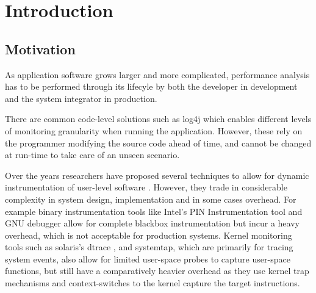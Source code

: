 
\section{Introduction}
\label{sec:intro}



\subsection{Motivation}

As application software grows larger and more complicated, performance analysis has to be performed through its lifecyle by both the developer in development and the system integrator in production.

There are common code-level solutions such as log4j \cite{log4j} which enables different levels of monitoring granularity when running the application. However, these rely on the programmer modifying the source code ahead of time, and cannot be changed at run-time to take care of an unseen scenario. 

Over the years researchers have proposed several techniques to allow for dynamic instrumentation of user-level software \cite{pin,gdb,dtrace,systemtap,lttng,utrace,ptrace}. However, they trade in considerable complexity in system design, implementation and in some cases overhead. For example binary instrumentation tools like Intel's PIN Instrumentation tool\cite{pin} and GNU debugger \cite{gdb} allow for complete blackbox instrumentation but incur a heavy overhead, which is not acceptable for production systems. Kernel monitoring tools such as solaris's dtrace \cite{dtrace}, and systemtap\cite{systemtap}, which are primarily for tracing system events, also allow for limited user-space probes to capture user-space functions, but still have a comparatively heavier overhead as they use kernel trap mechanisms and context-switches to the kernel capture the target instructions. 


